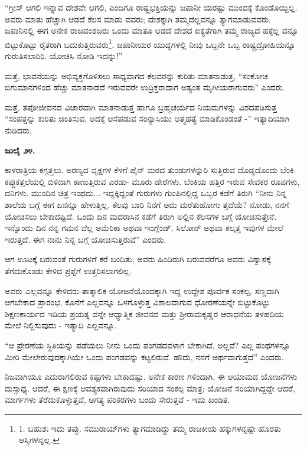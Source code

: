 “ಗ್ರೀಸ್ ಆಗಲಿ ಇನ್ನಾವ ದೇಶವೇ ಆಗಲಿ, ಎಂದಿಗೂ ರಾಷ್ಟ್ರಭಕ್ತಿಯನ್ನು ಜಪಾನೀ ಯರಷ್ಟು ಮುಂದಕ್ಕೆ ಕೊಂಡೊಯ್ದಿಲ್ಲ. ಅವರು ಮಾತು ಹೆಚ್ಚಾಗಿ ಆಡದೆ ಕೆಲಸ ಮಾಡು ವವರು; ದೇಶಕ್ಕಾಗಿ ತಮ್ಮದೆಲ್ಲವನ್ನೂ ತ್ಯಾಗಮಾಡುವವರು. ಜಪಾನಿನಲ್ಲಿ ಈಗ ಅನೇಕ ರಾಜವಂಶಜರು ಒಂದು ಮಾತೂ ಆಡದೆ ದೇಶದ ಐಕ್ಯತೆಗಾಗಿ ತಮ್ಮ ರಾಜ್ಯದ ಹಕ್ಕೆಲ್ಲ ವನ್ನೂ ಬಿಟ್ಟುಕೊಟ್ಟು ರೈತರಾಗಿ ಬದುಕುತ್ತಿರುವರು\footnote{1. ಬಹುಶಃ ಇದು ತಪ್ಪು. ಸಮುರಾಯ್​ಗಳು ತ್ಯಾಗಮಾಡಿದ್ದು ತಮ್ಮ ರಾಜಕೀಯ ಹಕ್ಕುಗಳನ್ನಷ್ಟೇ ಹೊರತು ಆಸ್ತಿಗಳನ್ನಲ್ಲ.}. ಜಪಾನೀಯರ ಯುದ್ಧಗಳಲ್ಲಿ ನೀವು ಒಬ್ಬನೇ ಒಬ್ಬ ರಾಷ್ಟ್ರದ್ರೋಹಿಯನ್ನೂ ಗುರುತಿಸಲಾರಿರಿ. ಯೋಚಿಸಿ ನೋಡಿ ಇದನ್ನು!”

ಮತ್ತೆ, ಭಾವನೆಯನ್ನು ಅಭಿವ್ಯಕ್ತಗೊಳಿಸಲು ಸಾಧ್ಯವಾಗದ ಕೆಲವರನ್ನು ಕುರಿತು ಮಾತನಾಡುತ್ತ, “ಸಂಕೋಚ ಬಿಗುಮಾನಗಳಿಂದ ಹೆಚ್ಚು ಮಾತನಾಡದೆ ಇರುವವರೇ ಉದ್ರಿಕ್ತರಾದಾಗ ಅತ್ಯಂತ ಮೃಗೀಯರಾಗುವರು” ಎಂದರು.

ಮತ್ತೆ, ತಪೋಜೀವನದ ವಿಚಾರವಾಗಿ ಮಾತನಾಡುತ್ತ ಹಾಗೂ ಬ್ರಹ್ಮಚರ್ಯದ ನಿಯಮಗಳನ್ನು ವಿಶದಪಡಿಸುತ್ತ “ಸಂಪತ್ತನ್ನು ಕುರಿತು ಚಿಂತಿಸುವ, ಅದಕ್ಕೆ ಆಸೆಪಡುವ ಸಂನ್ಯಾಸಿಯು ಆತ್ಮಹತ್ಯೆ ಮಾಡಿಕೊಂಡಂತೆ -” ಇತ್ಯಾದಿಯಾಗಿ ನುಡಿದರು.

\textbf{ಜುಲೈ ೨೪.}

ಕಾಳರಾತ್ರಿಯ ಕಗ್ಗತ್ತಲು. ಅರಣ್ಯದ ವೃಕ್ಷಗಳ ಕೆಳಗೆ ಪೈನ್ ಮರದ ತುಂಡುಗಳನ್ನುರಿ ಸುತ್ತಿರುವ ದೊಡ್ಡದೊಂದು ಬೆಂಕಿ. ಕಪ್ಪುಕತ್ತಲೆಯಲ್ಲಿ ಬಿಳಿದಾಗಿ ಕಾಣುತ್ತಿರುವ ಎರಡು- ಮೂರು ಡೇರೆಗಳು. ಬೆಂಕಿಯ ಹತ್ತಿರ ಇರುವ ಸೇವಕರ ರೂಪಗಳು, ದನಿಗಳು. ಮುಂದಿನ ಚಿತ್ರ ಇಂಥದು... ಇದ್ದಕ್ಕಿದ್ದಂತೆ ಗುರುಗಳು ಗುಂಪಿನಲ್ಲಿದ್ದ ಒಬ್ಬರ ಕಡೆಗೆ ತಿರುಗಿ “ನೀನು ನಿನ್ನ ಶಾಲೆಯ ಬಗ್ಗೆ ಈಗ ಏನನ್ನೂ ಹೇಳುತ್ತಿಲ್ಲ. ಕೆಲವು ಬಾರಿ ನಿನಗೆ ಅದು ಮರೆತುಹೋಗು ತ್ತದೆಯೆ? ನೋಡು, ನನಗೆ ಯೋಚಿಸಲು ಬೇಕಾದಷ್ಟಿದೆ. ಒಂದು ದಿನ ಮದರಾಸಿನ ಕಡೆಗೆ ತಿರುಗಿ ಅಲ್ಲಿನ ಕೆಲಸಗಳ ಬಗ್ಗೆ ಯೋಚಿಸುತ್ತೇನೆ. ಇನ್ನೊಂದು ದಿನ ನನ್ನ ಗಮನ ವೆಲ್ಲ ಅಮೆರಿಕಾ ಅಥವಾ ಇಂಗ್ಲೆಂಡ್, ಸಿಲೋನ್ ಅಥವಾ ಕಲ್ಕತ್ತ ಇವುಗಳ ಮೇಲೆ ಇರುತ್ತದೆ. ಈಗ ನಾನು ನಿನ್ನ ಬಗ್ಗೆ ಯೋಚಿಸುತ್ತಿರುವೆ” ಎಂದರು.

ಆಗ ಊಟಕ್ಕೆ ಬರುವಂತೆ ಗುರುಗಳಿಗೆ ಕರೆ ಬಂದಿತು; ಅವರು ಹಿಂದಿರುಗಿ ಬರುವವರೆಗೂ ಅವರು ವಿಶ್ವಾಸಕ್ಕೆ ತೆಗೆದುಕೊಂಡು ಕೇಳಿದ ಪ್ರಶ್ನೆಗೆ ಉತ್ತರಿಸಲಾಗಲಿಲ್ಲ.

ಅವರು ಎಲ್ಲವನ್ನೂ ಕೇಳಿದರು-ತಾತ್ಕಾಲಿಕ ಯೋಜನೆಯೊಂದಕ್ಕಾಗಿ ಇದ್ದ ಉದ್ದೇಶ ಪೂರ್ವಕ ಸಂಕಲ್ಪ, ಸಣ್ಣದಾಗಿ ಆಗಬೇಕಾದ ಪ್ರಾರಂಭ, ಕೊನೆಗೆ ಎಲ್ಲವನ್ನೂ ಒಳಗೊಳ್ಳುತ್ತ ವಿಶಾಲವಾಗುವ ಧೋರಣೆಯನ್ನೇ ಬಿಟ್ಟುಕೊಟ್ಟು ಶಿಕ್ಷಣಕಾರ್ಯದ ಇಡಿಯ ಪ್ರಯತ್ನ ವನ್ನೇ ಆಧ್ಯಾತ್ಮಿಕ ಜೀವನದ ಮತ್ತು ಶ‍್ರೀರಾಮಕೃಷ್ಣರ ಆರಾಧನೆಯ ತಳಹದಿಯ ಮೇಲೆ ನಿಲ್ಲಿಸುವುದು - ಇತ್ಯಾದಿ ಎಲ್ಲವನ್ನೂ.

“ಆ ಪ್ರೇರಣೆಯ ಸ್ಥಿತಿಯನ್ನು ಪಡೆಯಲು ನೀನು ಒಂದು ಪಂಗಡದವಳಾಗ ಬೇಕಾಗಿದೆ, ಅಲ್ಲವೆ? ಎಲ್ಲ ಪಂಥಗಳನ್ನೂ ಮೀರಿ ಮೇಲೇರುವುದಕ್ಕಾಗಿಯೇ ಒಂದು ಪಂಗಡವನ್ನು ಕಟ್ಟಲಿರುವೆ. ಹೌದು, ನನಗೆ ಅರ್ಥವಾಗುತ್ತದೆ” ಎಂದರು.

ನಿಜವಾಗಿಯೂ ಎದುರಾಗಲಿರುವ ಕಷ್ಟಗಳು ಬೇಕಾದಷ್ಟು. ಅನೇಕ ಕಾರಣ ಗಳಿಂದಾಗಿ, ಈ ಆಯಾಮದ ಯೋಜನೆಗಳು ದುಸ್ಸಾಧ್ಯ. ಆದರೆ, ಈ ಕ್ಷಣಕ್ಕೆ ಆವಶ್ಯಕವಾಗಿರುವುದು ಸರಿಯಾದ ಸಂಕಲ್ಪ ಮಾತ್ರ; ಯೋಜನೆ ಸರಿಯಾಗಿದ್ದದ್ದೇ ಆದರೆ, ಮಾರ್ಗಗಳು ತೆರೆದುಕೊಳ್ಳುತ್ತವೆ, ಅಗತ್ಯ ಪರಿಕರಗಳು ಬಂದು ಸೇರುತ್ತವೆ - ಇದು ಖಂಡಿತ.


